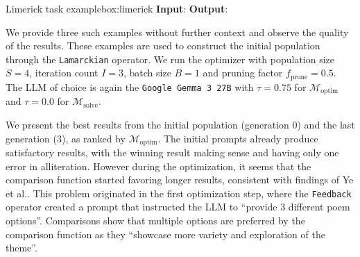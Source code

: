 \begin{figurebox}{Limerick task example}{box:limerick}
    \textbf{Input}:
    \textbf{Output}:
\end{figurebox}

We provide three such examples without further context and observe the quality of the results. These examples are used to construct the initial population through
the \texttt{Lamarckian} operator.
We run the optimizer with population size $S=4$, iteration count $I=3$, batch size $B=1$ and pruning factor $f_{\text{prune}} = 0.5$.
The LLM of choice is again the \texttt{Google Gemma 3 27B} with $\tau = 0.75$ for $\mathcal{M}_{\text{optim}}$ and $\tau = 0.0$ for $\mathcal{M}_{\text{solve}}$.

We present the best results from the initial population (generation $0$) and the last generation ($3$), as ranked by $\mathcal{M}_{\text{optim}}$.
The initial prompts already produce satisfactory results, with the winning result making sense and having only one error in alliteration.
However during the optimization, it seems that the comparison function started favoring longer results, consistent with findings of Ye et al.\cite{ye2024justiceprejudicequantifyingbiases}.
This problem originated in the first optimization step, where the \texttt{Feedback} operator created a prompt that instructed the LLM to ``provide 3 different poem options''.
Comparisons show that multiple options are preferred by the comparison function as they ``showcase more variety and exploration of the theme''.

